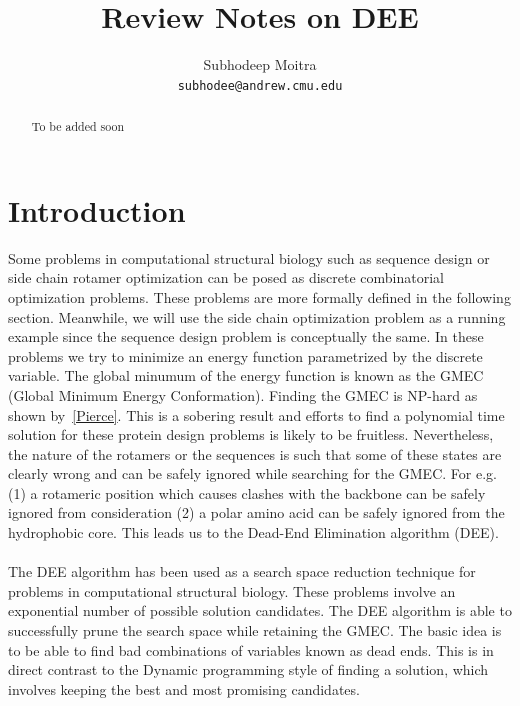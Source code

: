 \documentclass[a4]{article}
\begin{document}
\title{Review Notes on DEE}

\author{Subhodeep Moitra \\ {\tt subhodee@andrew.cmu.edu}}

\maketitle

\begin{abstract}
To be added soon
\end{abstract}

\section{Introduction}
Some problems in computational structural biology such as sequence design or side chain rotamer optimization can be posed as discrete combinatorial optimization problems. These problems are more formally defined in the following section. Meanwhile, we will use the side chain optimization problem as a running example since the sequence design problem is conceptually the same.  In these problems we try to minimize an energy function parametrized by the discrete variable. The global minumum of the energy function is known as the GMEC (Global Minimum Energy Conformation). Finding the GMEC is NP-hard as shown by~\ref{Pierce}. This is a sobering result and efforts to find a polynomial time solution for these protein design problems is likely to be fruitless. Nevertheless, the nature of the rotamers or the sequences is such that some of these states are clearly wrong and can be safely ignored while searching for the GMEC. For e.g.(1) a rotameric position which causes clashes with the backbone can be safely ignored from consideration (2) a polar amino acid can be safely ignored from the hydrophobic core. This leads us to the Dead-End Elimination algorithm (DEE). 
\\
\\
The DEE algorithm has been used as a search space reduction technique for problems in computational structural biology. These problems involve an exponential number of possible solution candidates. The DEE algorithm is able to successfully prune the search space while retaining the GMEC. The basic idea  is to be able to find bad combinations of variables known as dead ends. This is in direct contrast to the Dynamic programming style of finding a solution, which involves keeping the best and most promising candidates. 
\\
\end{document}
